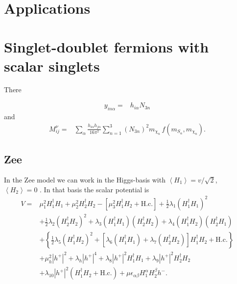 \section{Applications}

\section{Singlet-doublet fermions with scalar singlets}
There~\cite{Restrepo:2015ura}

\begin{align}
  y_{i n\alpha}=&h_{i\alpha}N_{3n} 
\end{align}
and 
\begin{align}
   M^{\nu}_{ij}=&\sum_{\alpha}\frac{h_{i\alpha}h_{j\alpha}}{16\pi^2}\sum_{n=1}^3 \left( N_{3n} \right)^2m_{\chi_n}
\,f\left( m_{S_\alpha},m_{\chi_n} \right).
\end{align}

\subsection{Zee}

In the Zee model we can work in the Higgs-basis with $\left\langle H_1 \right\rangle=v/\sqrt{2}$,  $\left\langle H_2 \right\rangle=0$ \cite{AristizabalSierra:2006ri}. In that basis the scalar potential is
\begin{align}
  \label{eq:scalarpotentialinhiggsbas}
  V  = & \mu^{2}_{1}H_{1}^{\dagger}H_{1}
  + \mu^{2}_{2}H_{2}^{\dagger}H_{2}
  - [\mu^{2}_{3}H_{1}^{\dagger}H_{2} + \mbox{H.c.}]
  + \frac{1}{2}\lambda_{1}(H_{1}^{\dagger}H_{1})^{2}
  \nonumber\\
  & + \frac{1}{2}\lambda_{2}(H_{2}^{\dagger}H_{2})^{2}
  + \lambda_{3}(H_{1}^{\dagger}
  H_{1})(H_{2}^{\dagger}H_{2})
  + \lambda_{4}(H_{1}^{\dagger}
  H_{2})(H_{2}^{\dagger}H_{1})
  \nonumber\\
  & + \left\{
    \frac{1}{2}\lambda_{5}(H_{1}^{\dagger}H_{2})^{2}
    + [\lambda_{6}(H_{1}^{\dagger}H_{1})
    + \lambda_{7}(H_{2}^{\dagger}H_{2})]
    H_{1}^{\dagger}H_{2}
    +\mbox{H.c.}
  \right\}
  \nonumber\\
  & + \mu_{h}^{2}|h^{+}|^{2} + \lambda_{h}|h^{+}|^{4}
  + \lambda_{8}|h^{+}|^{2}H_{1}^{\dagger}H_{1} 
  + \lambda_{9}|h^{+}|^{2}H_{2}^{\dagger}H_{2}
  \nonumber\\
  & + \lambda_{10}|h^{+}|^{2}(H_{1}^\dagger H_{2}
  + \mbox{H.c.})
  + \mu\epsilon_{\alpha\beta}H_{1}^{\alpha}
  H_{2}^{\beta}h^{-}.
\end{align}

